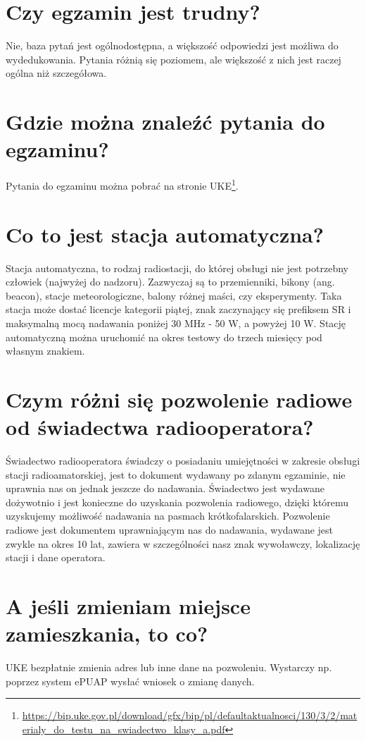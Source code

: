 \documentclass[a4paper,12pt]{article}
\begin{document}
\section{Czy egzamin jest trudny?}
Nie, baza pytań jest ogólnodostępna, a większość odpowiedzi jest możliwa do wydedukowania. Pytania różnią się poziomem, ale większość z nich jest raczej ogólna niż szczegółowa.

\section{Gdzie można znaleźć pytania do egzaminu?}
Pytania do egzaminu można pobrać na stronie UKE\footnote{\url{https://bip.uke.gov.pl/download/gfx/bip/pl/defaultaktualnosci/130/3/2/materialy_do_testu_na_swiadectwo_klasy_a.pdf}}.

\section{Co to jest stacja automatyczna?}
Stacja automatyczna, to rodzaj radiostacji, do której obsługi nie jest potrzebny człowiek (najwyżej do nadzoru). Zazwyczaj są to przemienniki, bikony (ang. beacon), stacje meteorologiczne, balony różnej maści, czy eksperymenty. Taka stacja może dostać licencje kategorii piątej, znak zaczynający się prefiksem SR i maksymalną mocą nadawania poniżej 30 MHz - 50 W, a powyżej 10 W.
Stację automatyczną można uruchomić na okres testowy do trzech miesięcy pod własnym znakiem.

\section{Czym różni się pozwolenie radiowe od świadectwa radiooperatora?}
Świadectwo radiooperatora świadczy o posiadaniu umiejętności w zakresie obsługi stacji radioamatorskiej, jest to dokument wydawany po zdanym egzaminie, nie uprawnia nas on jednak jeszcze do nadawania. Świadectwo jest wydawane dożywotnio i jest konieczne do uzyskania pozwolenia radiowego, dzięki któremu uzyskujemy możliwość nadawania na pasmach krótkofalarskich. Pozwolenie radiowe jest dokumentem uprawniającym nas do nadawania, wydawane jest zwykle na okres 10 lat, zawiera w szczególności nasz znak wywoławczy, lokalizację stacji i dane operatora.

\section{A jeśli zmieniam miejsce zamieszkania, to co?}
UKE bezpłatnie zmienia adres lub inne dane na pozwoleniu. Wystarczy np. poprzez system ePUAP wysłać wniosek o zmianę danych. 
\end{document}
